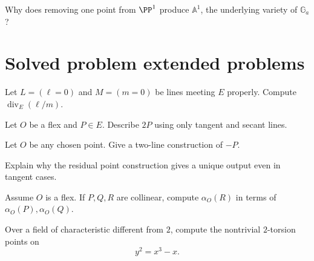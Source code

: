 \begin{exercise}\label{exr:vi43-24}
Why does removing one point from \(\PP^1\) produce \(\mathbb A^1\), the underlying variety of \(\mathbb G_a\)?
\end{exercise}

\ifdefined\IncludeExerciseHints

\fi
\ifdefined\IncludeExerciseSolutions

\fi

\section{Solved problem extended problems}

\begin{problem}\label{prob:vi43-01}
Let \(L=(\ell=0)\) and \(M=(m=0)\) be lines meeting \(E\) properly.  Compute \(\operatorname{div}_E(\ell/m)\).
\end{problem}

\begin{problem}\label{prob:vi43-02}
Let \(O\) be a flex and \(P\in E\).  Describe \(2P\) using only tangent and secant lines.
\end{problem}

\begin{problem}\label{prob:vi43-03}
Let \(O\) be any chosen point.  Give a two-line construction of \(-P\).
\end{problem}

\begin{problem}\label{prob:vi43-04}
Explain why the residual point construction gives a unique output even in tangent cases.
\end{problem}

\begin{problem}\label{prob:vi43-05}
Assume \(O\) is a flex.  If \(P,Q,R\) are collinear, compute \(\alpha_O(R)\) in terms of \(\alpha_O(P),\alpha_O(Q)\).
\end{problem}

\begin{problem}[Concrete addition on \(y^2=x^3-x\)]\label{prob:vi43-06}
Over a field of characteristic different from \(2\), compute the nontrivial \(2\)-torsion points on
\[
  y^2=x^3-x.
\]
\end{problem}

